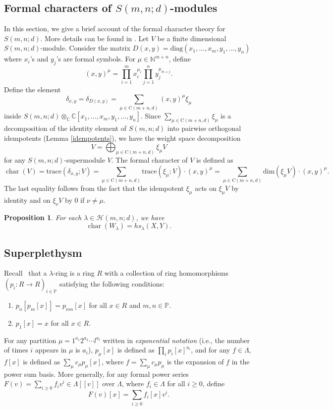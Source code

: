 \documentclass[12pt,reqno]{amsart}
\newtheorem{proposition}[theorem]{Proposition}
\theoremstyle{definition}
\theoremstyle{remark}
\newcommand{\Hi}{\mathcal{H}(m,n;d)}
\DeclareMathOperator{\ch}{char}
\begin{document}
\subsection{Formal characters of $S(m,n;d)$-modules} In this section, we give a brief account of the formal character theory for $S(m,n;d)$. More details can be found in \cite[Section 6.5]{axtell2018schur}.  Let $V$ be a finite dimensional $S(m,n;d)$-module. Consider the matrix $D(x,y)=\text{diag}(x_{1},\dotsc,x_{m},y_{1},\dotsc,y_{n})$ where $x_{i}$'s and $y_{j}$'s are formal symbols. For $\mu\in \mathbb{N}^{m+n}$, define $$(x,y)^{\mu}=\prod_{i=1}^{m}x_{i}^{\mu_{i}}\prod_{j=1}^{n}y_{j}^{\mu_{m+j}}.$$ Define the element $$\delta_{x,y}=\delta_{D(x,y)}=\sum_{\mu\in\text{C}(m+n,d)}(x,y)^{\mu}\xi_{\mu}$$ inside $S(m,n;d)\otimes_{\mathbb{C}} \mathbb{C}[x_{1},\dotsc,x_{m},y_{1},\dotsc,y_{n}]$. Since $\sum_{\mu\in\text{C}(m+n,d)}\xi_{\mu}$ is a decomposition of the identity element of $S(m,n;d)$ into pairwise orthogonal idempotents (Lemma \ref{idempotents}), we have the weight space decomposition $$V=\bigoplus_{\mu\in\text{C}(m+n,d)}\xi_{\mu}V$$
for any $S(m,n;d)$-supermodule $V$. The formal character of $V$ is defined as
$$\ch(V)=\text{trace}(\delta_{x,y};V)=\sum_{\mu\in\text{C}(m+n,d)}\text{trace}(\xi_{\mu};V)\cdot(x,y)^{\mu}=\sum_{\mu\in\text{C}(m+n,d)}\text{dim}(\xi_{\mu}V)\cdot(x,y)^{\mu}.$$  The last equality follows from the fact that the idempotent $\xi_{\mu}$ acts on $\xi_{\mu}V$ by identity and on $\xi_{\nu}V$ by $0$ if $\nu\neq\mu$.
\begin{proposition}{\em \cite[Proposition 6.5.2]{axtell2018schur}}
    For each $\lambda\in\Hi$, we have
    $$\ch(W_{\lambda})=hs_{\lambda}(X,Y).$$
\end{proposition}

\subsection{Superplethysm}\label{plethysm} Recall~\cite[Section 2.1]{carlsson2018proof} that a $\lambda$-ring is a ring $R$ with a collection of ring homomorphisms $(p_{i}:R\xrightarrow[]{}R)_{i\in\mathbb{P}}$ satisfying the following conditions:
\begin{enumerate}
    \item $p_{n}[p_{m}[x]]=p_{nm}[x]$ for all $x\in R$ and $m,n\in\mathbb{P}$.
    \item $p_{1}[x]=x$ for all $x\in R$.
\end{enumerate}
For any partition $\mu=1^{a_{1}}2^{a_{2}}\cdots l^{a_{l}}$ written in \emph{exponential notation} (i.e., the number of times $i$ appears in $\mu$ is $a_{i}$), $p_\mu[x]$ is defined as $\prod_i p_i[x]^{a_i}$, and for any $f\in \Lambda$, 
$f[x]$ is defined as $\sum_\mu c_\mu p_\mu[x]$, where $f=\sum_\mu c_\mu p_\mu$ is the expansion of $f$ in the power sum basis. More generally, for any formal power series $F(v)=\sum_{i\geq 0}f_{i}v^{i}\in \Lambda[[v]]$ over $\Lambda$, where $f_{i}\in\Lambda$ for all $i\geq 0$, define
$$F(v)[x]=\sum_{i\geq 0}f_{i}[x]v^{i}.$$
\end{document}
